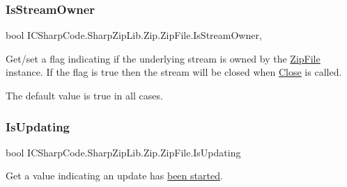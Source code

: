 \subsubsection{\texorpdfstring{Is\+Stream\+Owner}{IsStreamOwner}}
{\footnotesize\ttfamily bool I\+C\+Sharp\+Code.\+Sharp\+Zip\+Lib.\+Zip.\+Zip\+File.\+Is\+Stream\+Owner\hspace{0.3cm}{\ttfamily [get]}, {\ttfamily [set]}}



Get/set a flag indicating if the underlying stream is owned by the \hyperlink{class_i_c_sharp_code_1_1_sharp_zip_lib_1_1_zip_1_1_zip_file}{Zip\+File} instance. If the flag is true then the stream will be closed when \hyperlink{class_i_c_sharp_code_1_1_sharp_zip_lib_1_1_zip_1_1_zip_file_aeb7e59b277d058f45aa417cb07b4b1d3}{Close} is called. 

The default value is true in all cases. \mbox{\label{class_i_c_sharp_code_1_1_sharp_zip_lib_1_1_zip_1_1_zip_file_aeb3ac5f00ce8045355642877cd2c8c42}} 
\subsubsection{\texorpdfstring{Is\+Updating}{IsUpdating}}
{\footnotesize\ttfamily bool I\+C\+Sharp\+Code.\+Sharp\+Zip\+Lib.\+Zip.\+Zip\+File.\+Is\+Updating\hspace{0.3cm}{\ttfamily [get]}}



Get a value indicating an update has \hyperlink{class_i_c_sharp_code_1_1_sharp_zip_lib_1_1_zip_1_1_zip_file_a938dbbc553b0dc77b2c4914cec1da8a5}{been started}. 

\mbox{\label{class_i_c_sharp_code_1_1_sharp_zip_lib_1_1_zip_1_1_zip_file_a9c0da1463531c7c804f2821b848afb3b}} 
